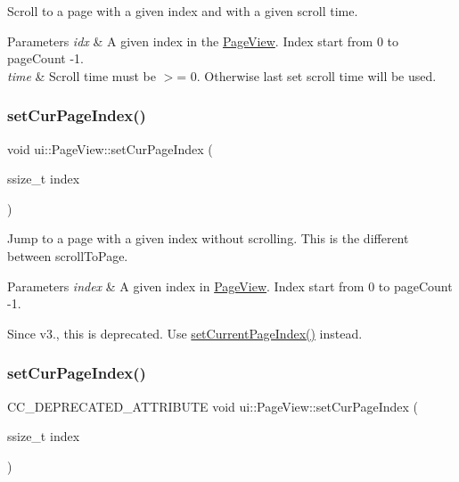 Scroll to a page with a given index and with a given scroll time.


\begin{DoxyParams}{Parameters}
{\em idx} & A given index in the \hyperlink{classui_1_1PageView}{Page\+View}. Index start from 0 to page\+Count -\/1. \\
\hline
{\em time} & Scroll time must be $>$= 0. Otherwise last set scroll time will be used. \\
\hline
\end{DoxyParams}
\mbox{\label{classui_1_1PageView_a153c32995f94a646e85bd827387c826f}} 
\subsubsection{\texorpdfstring{set\+Cur\+Page\+Index()}{setCurPageIndex()}\hspace{0.1cm}{\footnotesize\ttfamily [1/2]}}
{\footnotesize\ttfamily void ui\+::\+Page\+View\+::set\+Cur\+Page\+Index (\begin{DoxyParamCaption}\item[{ssize\+\_\+t}]{index }\end{DoxyParamCaption})}

Jump to a page with a given index without scrolling. This is the different between scroll\+To\+Page.


\begin{DoxyParams}{Parameters}
{\em index} & A given index in \hyperlink{classui_1_1PageView}{Page\+View}. Index start from 0 to page\+Count -\/1.\\
\hline
\end{DoxyParams}
Since v3., this is deprecated. Use {\ttfamily \hyperlink{classui_1_1PageView_a919770a660944565ae72d4cc4b571121}{set\+Current\+Page\+Index()}} instead. \mbox{\label{classui_1_1PageView_a916f5697ad97899b1dd9942aeba76680}} 
\subsubsection{\texorpdfstring{set\+Cur\+Page\+Index()}{setCurPageIndex()}\hspace{0.1cm}{\footnotesize\ttfamily [2/2]}}
{\footnotesize\ttfamily C\+C\+\_\+\+D\+E\+P\+R\+E\+C\+A\+T\+E\+D\+\_\+\+A\+T\+T\+R\+I\+B\+U\+TE void ui\+::\+Page\+View\+::set\+Cur\+Page\+Index (\begin{DoxyParamCaption}\item[{ssize\+\_\+t}]{index }\end{DoxyParamCaption})}

